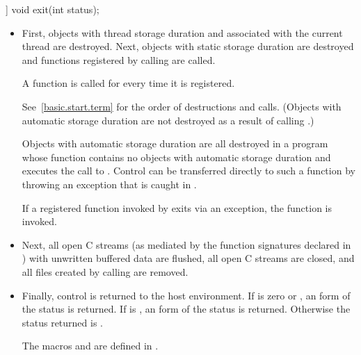 %
\begin{itemdecl}
[[noreturn]] void exit(int status);
\end{itemdecl}

\begin{itemdescr}
\pnum
\effects
\begin{itemize}
\item
First, objects with thread storage duration and associated with the current thread
are destroyed. Next, objects with static storage duration are destroyed
and functions registered by calling
are called.
\begin{footnote}
A function is called for every time it is registered.
\end{footnote}
See~\ref{basic.start.term} for the order of destructions and calls.
(Objects with automatic storage duration are not destroyed as a result of calling
.)
\begin{footnote}
Objects with automatic storage duration are all destroyed in a program whose
 function
contains no objects with automatic storage duration and executes the call to
.
Control can be transferred directly to such a
 function
by throwing an exception that is caught in
.
\end{footnote}

If a registered function invoked by  exits via an exception,
the function  is invoked.%
%

\item
Next, all open C streams (as mediated by the function
signatures declared in )
with unwritten buffered data are flushed, all open C
streams are closed, and all files created by calling
 are removed.

\item
Finally, control is returned to the host environment.
If  is zero or
,
an 
form of the status
is returned.
If  is
,
an  form of the status
is returned.
Otherwise the status returned is .
\begin{footnote}
The macros  and 
are defined in .
\end{footnote}
\end{itemize}
\end{itemdescr}

